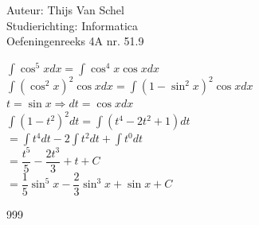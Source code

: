 \documentclass[a4paper]{article}
\newcommand{\dint}{\displaystyle\int}
\begin{document}
  
\noindent \large Auteur: Thijs Van Schel \\
\noindent \large Studierichting: Informatica\\
\noindent \large Oefeningenreeks 4A nr. 51.9\\

\medskip

\normalsize

$\dint \cos^5xdx = \dint \cos^4x\cos xdx$\\

$\dint (\cos^2x)^2\cos xdx = \dint (1-\sin^2x)^2\cos xdx$\\

$t = \sin x \Rightarrow dt = \cos x dx$\\

$\dint (1-t^2)^2dt = \dint (t^4-2t^2+1)dt$\\

$= \dint t^4dt -2 \dint t^2dt+\dint t^0dt$\\

$= \dfrac{t^5}{5}-\dfrac{2t^3}{3}+t + C$\\

$= \dfrac{1}{5}\sin^5 x - \dfrac{2}{3}\sin^3x+\sin x + C$

\begin{thebibliography}{999}
\end{thebibliography}
\end{document}
